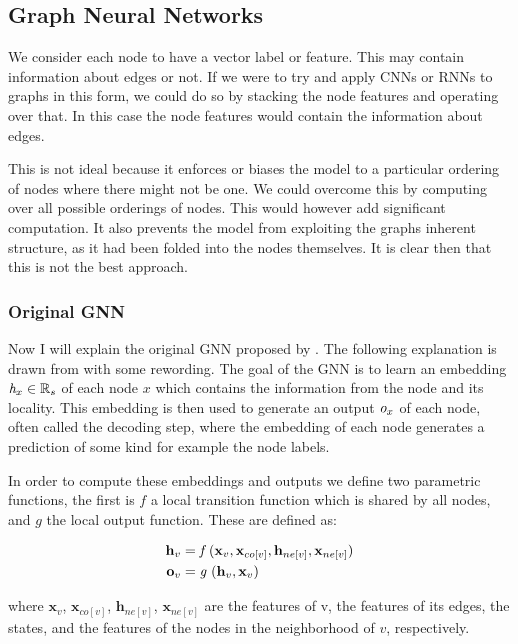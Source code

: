 \documentclass[]{../resources/final_report}
\newcommand{\Reals}{\mathbb{R}}
\begin{document}
\subsection{Graph Neural Networks}

We consider each node to have a vector label or feature. This may contain information about edges or not.
If we were to try and apply CNNs or RNNs to graphs in this form, we could do so by stacking the node 
features and operating over that. In this case the node features would contain the information about edges.

This is not ideal because it enforces or biases the model to a particular ordering of nodes where there 
might not be one. We could overcome this by computing over all possible orderings of nodes.
This would however add significant computation. \cite{graphoverview}
It also prevents the model from exploiting the graphs inherent structure, as it had been 
folded into the nodes themselves. It is clear then that this is not the best approach.

\subsubsection{Original GNN}
Now I will explain the original GNN proposed by \cite{GNN}. The following explanation is drawn from \cite{graphoverview} with some rewording. 
The goal of the GNN is to learn an embedding $ \emph{h}_x \in \Reals_s $ of each node $x$ which contains the information 
from the node and its locality. This embedding is then used to generate an output $\emph{o}_x$ of each node, often called the decoding step,
where the embedding of each node generates a prediction of some kind for example the node labels.

In order to compute these embeddings and outputs we define two parametric functions, the first is $f$ a 
local transition function which is shared by all nodes, and $g$ the local output function. These are defined as:

\begin{align}
  \textbf{h}_v &= \emph{f }(\textbf{x}_v, \textbf{x}_{co[v]}, \textbf{h}_{ne[v]}, \textbf{x}_{ne[v]})\\
  \textbf{o}_v &= \emph{g }(\textbf{h}_v, \textbf{x}_v)
\end{align}

where $\textbf{x}_v$, $\textbf{x}_{co[v]}$, $\textbf{h}_{ne[v]}$, $\textbf{x}_{ne[v]}$ are the features of v, the features of its edges, 
the states, and the features of the nodes in the neighborhood of $v$, respectively.
\end{document}
